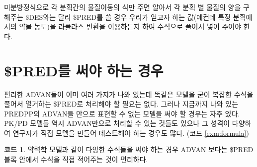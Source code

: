 \documentclass[
  10pt,
  krantz2,
  a4paper]{krantz}
\newenvironment{Shaded}{\begin{snugshade}}{\end{snugshade}}
\newcommand{\DecValTok}[1]{\textcolor[rgb]{0.00,0.00,0.81}{#1}}
\newcommand{\ErrorTok}[1]{\textcolor[rgb]{0.64,0.00,0.00}{\textbf{#1}}}
\newcommand{\KeywordTok}[1]{\textcolor[rgb]{0.13,0.29,0.53}{\textbf{#1}}}
\newcommand{\NormalTok}[1]{#1}
\newcommand{\OperatorTok}[1]{\textcolor[rgb]{0.81,0.36,0.00}{\textbf{#1}}}
\newcommand{\StringTok}[1]{\textcolor[rgb]{0.31,0.60,0.02}{#1}}
\newenvironment{Shaded}{\begin{snugshade}}{\end{snugshade}}
\theoremstyle{definition}
\theoremstyle{definition}
\newtheorem{example}{코드}[chapter]
\theoremstyle{definition}
\theoremstyle{remark}
\begin{document}
미분방정식으로 각 분획간의 물질이동의 식만 주면 알아서 각 분획 별 물질의 양을 구해주는 \$DES와는 달리 \$PRED를 쓸 경우 우리가 얻고자 하는 값(예컨데 특정 분획에서의 약물 농도)을 라플라스 변환을 이용하든지 하여 수식으로 풀어서 넣어 주어야 한다.

\hypertarget{preduxb97c-uxc368uxc57c-uxd558uxb294-uxacbduxc6b0}{%
\section{\$PRED를 써야 하는 경우}\label{preduxb97c-uxc368uxc57c-uxd558uxb294-uxacbduxc6b0}}

편리한 ADVAN들이 이미 여러 가지가 나와 있는데 똑같은 모델을 굳이 복잡한 수식을 풀어서 열거하는 \$PRED로 처리해야 할 필요는 없다. 그러나 지금까지 나와 있는 PREDPP의 ADVAN들 만으로 표현할 수 없는 모델을 써야 할 경우는 자주 있다. PK/PD 모델들 역시 ADVAN만으로 처리할 수 있는 것들도 있으나 그 성격이 다양하여 연구자가 직접 모델을 만들어 테스트해야 하는 경우도 많다. (코드 \ref{exm:formula})

\begin{Shaded}
\end{Shaded}

\begin{example}
\protect\hypertarget{exm:formula}{}{\label{exm:formula} }약력학 모델과 같이 다양한 수식들을 써야 하는 경우 ADVAN 보다는 \$PRED 블록 안에서 수식을 직접 적어주는 것이 편리하다.
\end{example}
\end{document}
